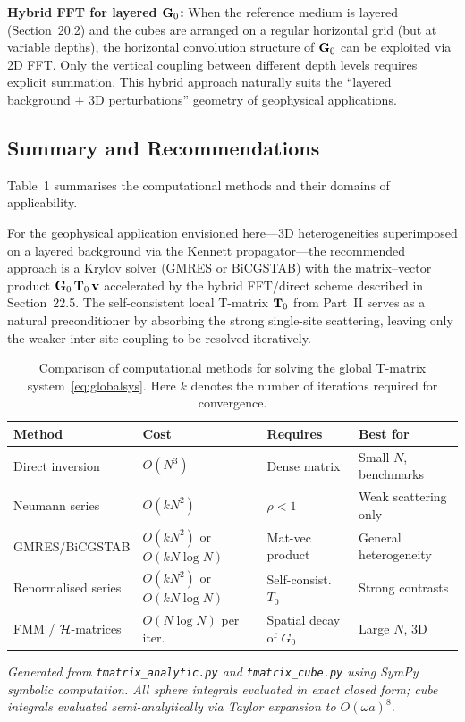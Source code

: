 \textbf{Hybrid FFT for layered $\mathbf{G}_0$:}  When the reference medium is
layered (Section~20.2) and the cubes are arranged on a regular horizontal
grid (but at variable depths), the horizontal convolution structure of
$\mathbf{G}_0$ can be exploited via 2D FFT.  Only the vertical coupling between
different depth levels requires explicit summation.  This hybrid approach
naturally suits the ``layered background + 3D perturbations'' geometry of
geophysical applications.


\subsection{Summary and Recommendations}

Table~1 summarises the computational methods and their domains of
applicability.

For the geophysical application envisioned here---3D heterogeneities
superimposed on a layered background via the Kennett propagator---the
recommended approach is a Krylov solver (GMRES or BiCGSTAB) with the
matrix--vector product $\mathbf{G}_0\,\mathbf{T}_0\,\mathbf{v}$ accelerated by the hybrid
FFT/direct scheme described in Section~22.5.  The self-consistent local
T-matrix $\mathbf{T}_0$ from Part~II serves as a natural preconditioner by
absorbing the strong single-site scattering, leaving only the weaker
inter-site coupling to be resolved iteratively.

\begin{table}[ht]
\centering
\begin{tabular}{llll}
\toprule
\textbf{Method} & \textbf{Cost} & \textbf{Requires} & \textbf{Best for} \\
\midrule
Direct inversion      & $O(N^3)$                       & Dense matrix              & Small $N$, benchmarks \\
Neumann series        & $O(kN^2)$                      & $\rho < 1$                & Weak scattering only \\
GMRES/BiCGSTAB        & $O(kN^2)$ or $O(kN\!\log\!N)$  & Mat-vec product           & General heterogeneity \\
Renormalised series   & $O(kN^2)$ or $O(kN\!\log\!N)$  & Self-consist.\ $T_0$      & Strong contrasts \\
FMM / $\mathcal{H}$-matrices & $O(N\!\log\!N)$ per iter. & Spatial decay of $G_0$ & Large $N$, 3D \\
\bottomrule
\end{tabular}
\caption{Comparison of computational methods for solving the global T-matrix system~\eqref{eq:globalsys}.
Here $k$ denotes the number of iterations required for convergence.}
\end{table}

\bigskip
\noindent
\textit{Generated from \texttt{tmatrix\_analytic.py} and \texttt{tmatrix\_cube.py}
using SymPy symbolic computation.  All sphere integrals evaluated in exact closed
form; cube integrals evaluated semi-analytically via Taylor expansion to
$O(\omega a)^8$.}
